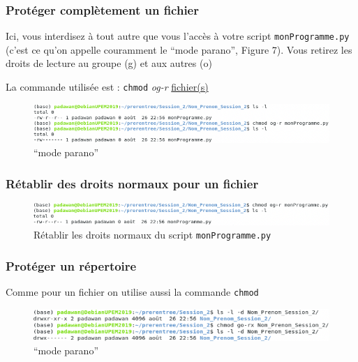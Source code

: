 \documentclass{article}
\begin{document}
\subsubsection{Protéger complètement un fichier } 

Ici, vous interdisez à tout autre que vous l'accès à votre script \texttt{monProgramme.py} (c'est ce qu'on appelle couramment le ``mode parano'', Figure 7). Vous retirez les droits de lecture au groupe (g) et aux autres (o) 

La commande utilisée est : \texttt{chmod} \emph{og-r} \underline{fichier(s)}

\begin{figure}[h!]
    \begin{center}
    \includegraphics[scale=0.6]{fichier_Enlever_Droit.png}
    \caption{``mode parano''}
     \end{center}
\end{figure}   

\subsubsection{Rétablir des droits normaux pour un fichier } 

\begin{figure}[h!]
    \begin{center}
    \includegraphics[scale=0.6]{fichier_Retablir_Droit.png}
    \caption{Rétablir les droits normaux du script \texttt{monProgramme.py} }
     \end{center}
\end{figure}   

\subsubsection{Protéger un répertoire} 

Comme pour un fichier on utilise aussi la commande \texttt{chmod}

\begin{figure}[h!]
    \begin{center}
    \includegraphics[scale=0.6]{rep_Enlever_Droit.png}
    \caption{``mode parano''}
     \end{center}
\end{figure}   
\end{document}
